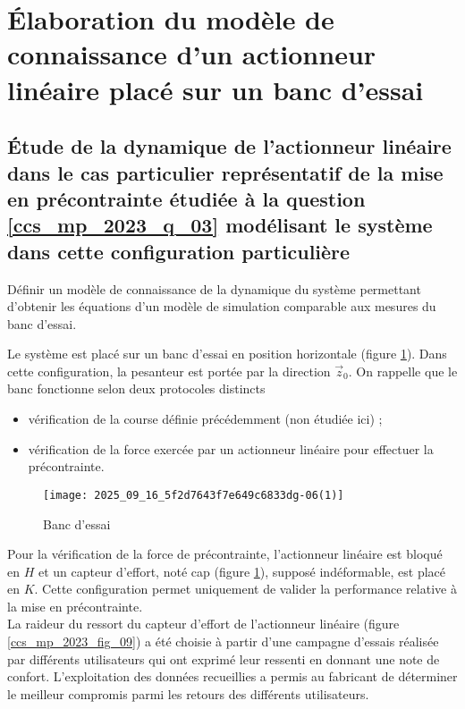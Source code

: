 
\section{Élaboration du modèle de connaissance d'un actionneur linéaire placé sur un banc d'essai}%
\subsection{Étude de la dynamique de l'actionneur linéaire dans le cas particulier représentatif de la mise en précontrainte étudiée à la question \ref{ccs_mp_2023_q_03} modélisant le système dans cette configuration particulière}

\begin{obj}
Définir un modèle de connaissance de la dynamique du système permettant d'obtenir les équations d'un modèle de simulation comparable aux mesures du banc d'essai.
\end{obj}

\ifprof
\else

Le système est placé sur un banc d'essai en position horizontale (figure \ref{ccs_mp_2023_fig_08}). Dans cette configuration, la pesanteur est portée par la direction $\vec{z}_{0}$. On rappelle que le banc fonctionne selon deux protocoles distincts

\begin{itemize}
  \item vérification de la course définie précédemment (non étudiée ici) ;
  \item vérification de la force exercée par un actionneur linéaire pour effectuer la précontrainte.
\end{itemize}



\begin{figure}[!h]
\centering
\texttt{[image: 2025\_09\_16\_5f2d7643f7e649c6833dg-06(1)]}
\caption{\label{ccs_mp_2023_fig_08}  Banc d'essai}
\end{figure}



Pour la vérification de la force de précontrainte, l'actionneur linéaire est bloqué en $H$ et un capteur d'effort, noté cap (figure \ref{ccs_mp_2023_fig_08}), supposé indéformable, est placé en $K$. Cette configuration permet uniquement de valider la performance relative à la mise en précontrainte.\\
La raideur du ressort du capteur d'effort de l'actionneur linéaire (figure \ref{ccs_mp_2023_fig_09}) a été choisie à partir d'une campagne d'essais réalisée par différents utilisateurs qui ont exprimé leur ressenti en donnant une note de confort. L'exploitation des données recueillies a permis au fabricant de déterminer le meilleur compromis parmi les retours des différents utilisateurs.

